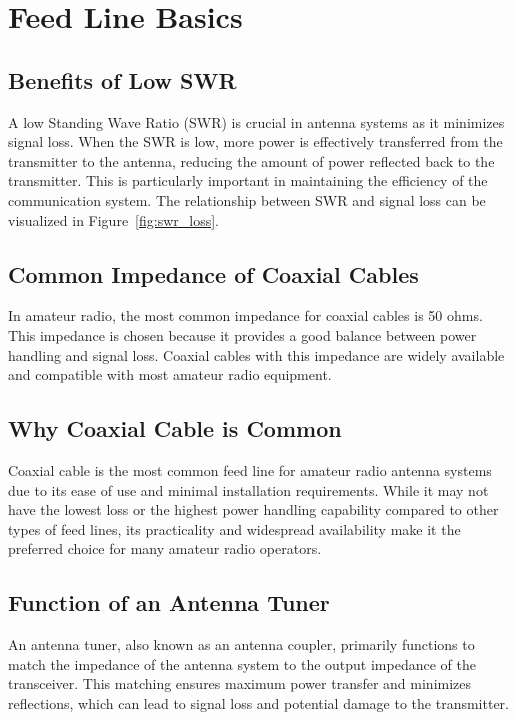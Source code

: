 \section{Feed Line Basics}
\label{section:feed_line_basics}

\subsection*{Benefits of Low SWR}
A low Standing Wave Ratio (SWR) is crucial in antenna systems as it minimizes signal loss. When the SWR is low, more power is effectively transferred from the transmitter to the antenna, reducing the amount of power reflected back to the transmitter. This is particularly important in maintaining the efficiency of the communication system. The relationship between SWR and signal loss can be visualized in Figure~\ref{fig:swr_loss}.

\subsection*{Common Impedance of Coaxial Cables}
In amateur radio, the most common impedance for coaxial cables is 50 ohms. This impedance is chosen because it provides a good balance between power handling and signal loss. Coaxial cables with this impedance are widely available and compatible with most amateur radio equipment.

\subsection*{Why Coaxial Cable is Common}
Coaxial cable is the most common feed line for amateur radio antenna systems due to its ease of use and minimal installation requirements. While it may not have the lowest loss or the highest power handling capability compared to other types of feed lines, its practicality and widespread availability make it the preferred choice for many amateur radio operators.

\subsection*{Function of an Antenna Tuner}
An antenna tuner, also known as an antenna coupler, primarily functions to match the impedance of the antenna system to the output impedance of the transceiver. This matching ensures maximum power transfer and minimizes reflections, which can lead to signal loss and potential damage to the transmitter.

